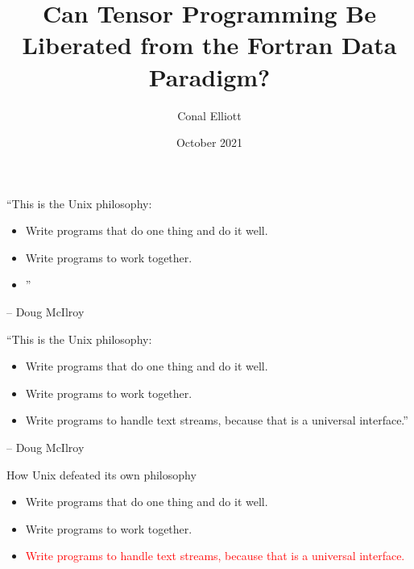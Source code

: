 \documentclass[aspectratio=169]{beamer}
\title{Can Tensor Programming Be Liberated from the Fortran Data Paradigm?}
\author{Conal Elliott}
\date{October 2021}
\begin{document}
\begin{center}
\maketitle
{}
\end{center}

\begin{frame}{``This is the Unix philosophy:}
\begin{itemize}\itemsep4ex
\item Write programs that do one thing and do it well.
\item Write programs to work together.
\item \hspace{4.688in}{\ }''
\end{itemize}
\vspace{2ex}
\begin{flushright}
-- Doug McIlroy \hspace{0.5in}{\ }
\end{flushright}
\end{frame}

\begin{frame}{``This is the Unix philosophy:}
\begin{itemize}\itemsep4ex
\item Write programs that do one thing and do it well.
\item Write programs to work together.
\item Write programs to handle text streams, because that is a universal interface.''
\end{itemize}
\vspace{2ex}
\begin{flushright}
-- Doug McIlroy \hspace{0.5in}{\ }
\end{flushright}
\end{frame}

\begin{frame}{How Unix defeated its own philosophy}
\begin{itemize}\itemsep4ex
\item Write programs that do one thing and do it well.
\item Write programs to work together.
\item \textcolor{red}{Write programs to handle text streams, because that is a universal interface.}
\end{itemize}
\vspace{9.8ex}
\end{frame}
\end{document}
